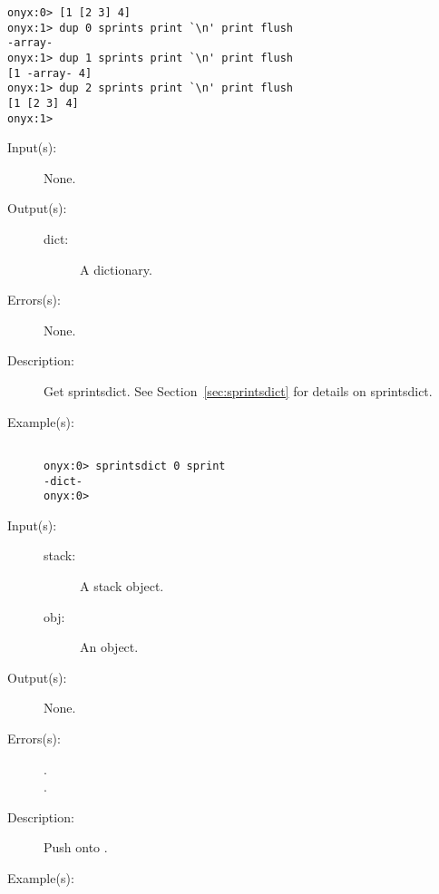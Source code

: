 \begin{description}
\begin{description}
\begin{verbatim}
onyx:0> [1 [2 3] 4]
onyx:1> dup 0 sprints print `\n' print flush
-array-
onyx:1> dup 1 sprints print `\n' print flush
[1 -array- 4]
onyx:1> dup 2 sprints print `\n' print flush
[1 [2 3] 4]
onyx:1>
		\end{verbatim}
	\end{description}
\label{systemdict:sprintsdict}
\item[{\onyxop{--}{sprintsdict}{dict}}: ]
	\begin{description}\item[]
	\item[Input(s): ] None.
	\item[Output(s): ]
		\begin{description}\item[]
		\item[dict: ]
			A dictionary.
		\end{description}
	\item[Errors(s): ] None.
	\item[Description: ]
		Get sprintsdict.  See Section~\ref{sec:sprintsdict} for details
		on sprintsdict.
	\item[Example(s): ]\begin{verbatim}

onyx:0> sprintsdict 0 sprint
-dict-
onyx:0>
		\end{verbatim}
	\end{description}
\label{systemdict:spush}
\item[{\onyxop{stack obj}{spush}{--}}: ]
	\begin{description}\item[]
	\item[Input(s): ]
		\begin{description}\item[]
		\item[stack: ]
			A stack object.
		\item[obj: ]
			An object.
		\end{description}
	\item[Output(s): ] None.
	\item[Errors(s): ]
		\begin{description}\item[]
		\item[.]
		\item[.]
		\end{description}
	\item[Description: ]
		Push  onto .
	\item[Example(s): ]\begin{verbatim}


\end{verbatim}
\end{description}
\end{description}
